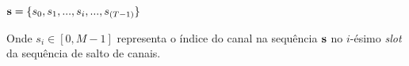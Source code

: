 \vspace{0.3cm}

${\bf s} = \{s_0, s_1,...,s_i,...,s_{(T-1)}\}$ \\

\vspace{0.3cm}

Onde $s_i \in [0, M-1]$ representa o índice do canal na sequência ${\bf s}$ no $i$-ésimo {\it slot} da sequência de salto de canais. 





